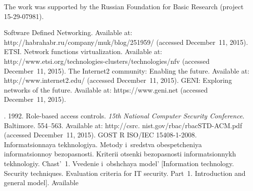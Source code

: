 

\vspace*{-12pt}

\Ack

\vspace*{-2pt}

    \noindent
The work was supported by the Russian Foundation for Basic Research (project 15-29-07981).




  \begin{multicols}{2}

\renewcommand{\bibname}{\protect\rmfamily References}

{\small\frenchspacing
 {%
 \begin{thebibliography}{9}
Software Defined Networking. Available at: 
{\sf http://\linebreak habrahabr.ru/company/muk/blog/251959/}
(accessed December~11, 2015).
 ETSI. Network functions virtualization. Available at: 
{\sf http://www.etsi.org/technologies-clusters/\linebreak technologies/nfv}
(accessed December~11, 2015).
The Internet2 community: Enabling the future.  Available at: 
{\sf http://www.internet2.edu/}
(accessed December~11, 2015).
 GENI: Exploring networks of the future. Available at: {\sf https://www.geni.net}
 (accessed December~11, 2015).

. 1992. 
Role-based access controls. \textit{15th National 
Computer Security Conference}. Baltimore. 554--563.
Available at: 
{\sf http://csrc. nist.gov/rbac/rbacSTD-ACM.pdf} (accessed December~11, 2015).
GOST R ISO/IEC 15408-1-2008. Informatsionnaya tekhnologiya. Metody 
i~sredstva obespetcheniya infor\-ma\-tsi\-on\-noy bez\-opas\-nosti. Kriterii otsenki bezopasnosti 
informatsionnykh tekhnologiy. Chast'~1. Vvedenie i~ob\-shchaya model' [Information 
technology. Security techniques. Evaluation criteria for IT security. Part~1. 
Introduction and general model]. Available\linebreak\vspace*{-12pt}


\end{thebibliography}}}
\end{multicols}
